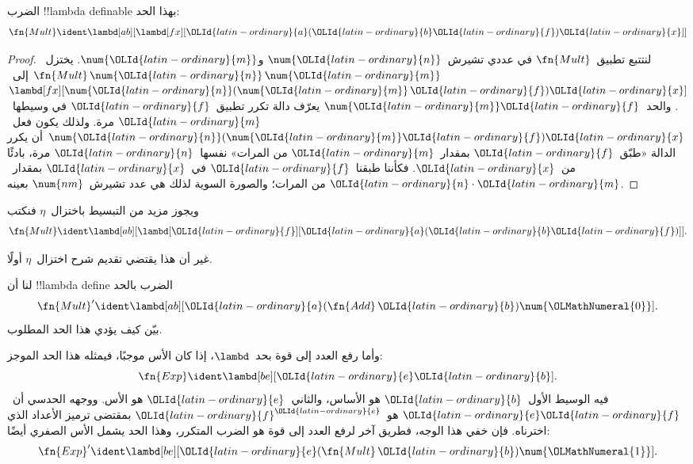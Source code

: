 \documentclass[../../../include/open-logic-section]{subfiles}
\begin{document}
\begin{prop}
  الضرب !!{lambda definable} بهذا الحد:
  \[
  \fn{Mult} \ident \lambd[ab][\lambd[fx][\OLId{latin-ordinary}{a} (\OLId{latin-ordinary}{b} \OLId{latin-ordinary}{f}) \OLId{latin-ordinary}{x}]]
  \]
\end{prop}

\begin{proof}
  لنتتبع تطبيق~$\fn{Mult}$ في عددي تشيرش~$\num{\OLId{latin-ordinary}{n}}$ و$\num{\OLId{latin-ordinary}{m}}$.
  يختزل~$\fn{Mult} \, \num{\OLId{latin-ordinary}{n}} \, \num{\OLId{latin-ordinary}{m}}$
  إلى~$\lambd[fx][\num{\OLId{latin-ordinary}{n}}(\num{\OLId{latin-ordinary}{m}}\, \OLId{latin-ordinary}{f})\OLId{latin-ordinary}{x}]$.
  والحد~$\num{\OLId{latin-ordinary}{m}} \OLId{latin-ordinary}{f}$ يعرّف دالة تكرر تطبيق~$\OLId{latin-ordinary}{f}$ في وسيطها~$\OLId{latin-ordinary}{m}$ مرة.
  ولذلك يكون فعل~$\num{\OLId{latin-ordinary}{n}} (\num{\OLId{latin-ordinary}{m}} \OLId{latin-ordinary}{f}) \OLId{latin-ordinary}{x}$
  أن يكرر الدالة «طبّق~$\OLId{latin-ordinary}{f}$ بمقدار~$\OLId{latin-ordinary}{m}$ من المرات»
  نفسها~$\OLId{latin-ordinary}{n}$ مرة، بادئًا من~$\OLId{latin-ordinary}{x}$.
  فكأننا طبقنا~$\OLId{latin-ordinary}{f}$ في~$\OLId{latin-ordinary}{x}$ بمقدار~$\OLId{latin-ordinary}{n}\cdot \OLId{latin-ordinary}{m}$ من المرات؛
  والصورة السوية لذلك هي عدد تشيرش~$\num{nm}$ بعينه.
\end{proof}

\begin{editorial}
ويجوز مزيد من التبسيط باختزال~$\eta$ فنكتب
\[
  \fn{Mult} \ident \lambd[ab][\lambd[\OLId{latin-ordinary}{f}][\OLId{latin-ordinary}{a} (\OLId{latin-ordinary}{b} \OLId{latin-ordinary}{f})]].
\]

غير أن هذا يقتضي تقديم شرح اختزال~$\eta$ أولًا.
\end{editorial}

\begin{prob}
لنا أن !!{lambda define} الضرب بالحد
\[
  \fn{Mult}' \ident \lambd[ab][\OLId{latin-ordinary}{a} (\fn{Add}\, \OLId{latin-ordinary}{b}) \num{\OLMathNumeral{0}}].
\]
بيّن كيف يؤدي هذا الحد المطلوب.
\end{prob}

وأما رفع العدد إلى قوة بحد~$\lambd$، إذا كان الأس موجبًا، فيمثله هذا الحد الموجز:
\[
  \fn{Exp} \ident \lambd[be][\OLId{latin-ordinary}{e} \OLId{latin-ordinary}{b}].
\]
فيه الوسيط الأول~$\OLId{latin-ordinary}{b}$ هو الأساس، والثاني~$\OLId{latin-ordinary}{e}$ هو الأس.
ووجهه الحدسي أن~$\OLId{latin-ordinary}{e} \OLId{latin-ordinary}{f}$ هو~$\OLId{latin-ordinary}{f}^\OLId{latin-ordinary}{e}$ بمقتضى ترميز الأعداد الذي اخترناه.
فإن خفي هذا الوجه، فطريق آخر لرفع العدد إلى قوة هو الضرب المتكرر،
وهذا الحد يشمل الأس الصفري أيضًا:
\[
  \fn{Exp}' \ident \lambd[be][\OLId{latin-ordinary}{e} (\fn{Mult}\, \OLId{latin-ordinary}{b}) \num{\OLMathNumeral{1}}].
\]
\end{document}
